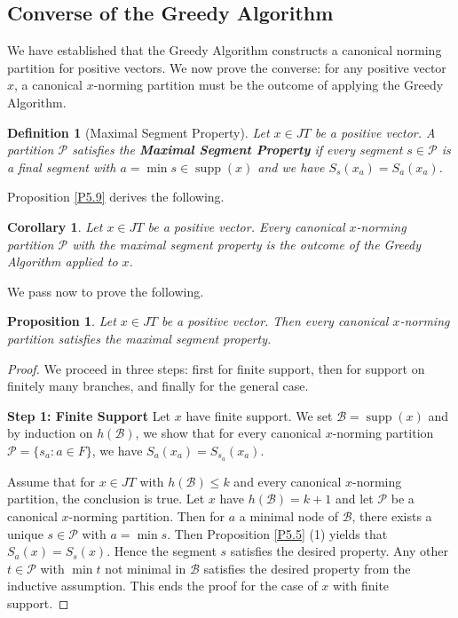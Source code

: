 \documentclass[11pt,a4paper]{amsart}
\newtheorem{proposition}[theorem]{Proposition}
\newtheorem{definition}[theorem]{Definition}
\newtheorem{corollary}[theorem]{Corollary}
\newcommand{\JT}{JT}
\newcommand{\supp}{\operatorname{supp}}
\begin{document}
\subsection{Converse of the Greedy Algorithm}

We have established that the Greedy Algorithm constructs a canonical norming partition for positive vectors. We now prove the converse: for any positive vector $x$, a canonical $x$-norming partition must be the outcome of applying the Greedy Algorithm.

\begin{definition}[Maximal Segment Property]
    Let $x \in \JT$ be a positive vector. A partition $\mathcal{P}$ satisfies the \textbf{Maximal Segment Property} if every segment $s \in \mathcal{P}$ is a final segment with $a = \min s \in \supp(x)$ and we have $S_s(x_a)= S_a(x_a)$.
\end{definition}
Proposition \ref{P5.9} derives the following.
\begin{corollary}\label{C5.13}
    Let $x\in \JT$ be a positive vector. Every canonical $x$-norming partition $\mathcal{P}$ with the maximal segment property is the outcome of the Greedy Algorithm applied to $x$.
\end{corollary}
We pass now to prove the following.

\begin{proposition}\label{P5.14}
    Let $x \in \JT$ be a positive vector. Then every canonical $x$-norming partition satisfies the maximal segment property. 
\end{proposition}

\begin{proof}
    We proceed in three steps: first for finite support, then for support on finitely many branches, and finally for the general case.
    
    \textbf{Step 1: Finite Support}
    Let $x$ have finite support. We set $\mathcal{B} = \supp(x)$ and by induction on $h(\mathcal{B})$, we show that for every canonical $x$-norming partition $\mathcal{P}= \{ s_a : a\in F\}$, we have $S_a(x_a) = S_{s_a}(x_a)$. 
    
    Assume that for $x\in \JT$ with $h(\mathcal{B}) \le k$ and every canonical $x$-norming partition, the conclusion is true.
    Let $x$ have $h(\mathcal{B}) = k+1$ and let $\mathcal{P}$ be a canonical $x$-norming partition. Then for $a$ a minimal node 
    of $\mathcal{B}$, there exists a unique $s\in \mathcal{P}$ with $a= \min s$. Then Proposition \ref{P5.5} (1) yields that
    $S_a(x)=S_s(x)$. Hence the segment $s$ satisfies the desired property. Any other $t\in \mathcal{P}$ with 
    $\min t$ not minimal in $\mathcal{B}$ satisfies the desired property from the inductive assumption. This ends the proof for the case of $x$ with finite support.
    \end{proof}
    
\end{document}
